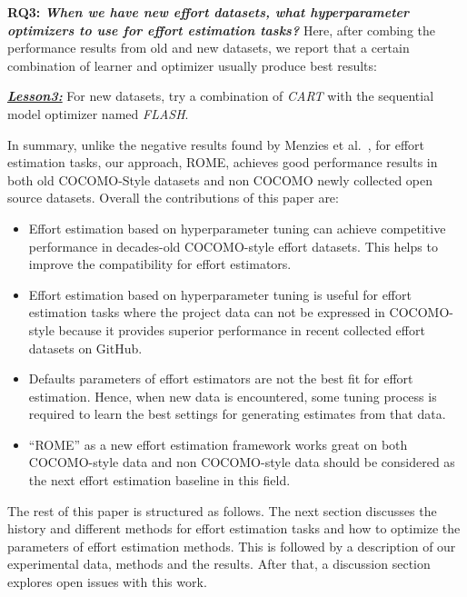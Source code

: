 \documentclass[sigconf,review,anonymous]{acmart}
\newcommand{\bi}{\begin{itemize}}
\newcommand{\ei}{\end{itemize}}
\newenvironment{result}[2]
{\begin{myshadowbox}\textbf{\textit{\underline{Lesson#1:}}} #2}{ 
\end{myshadowbox}}
\begin{document}
{\bf RQ3: \em When we have new effort datasets, what hyperparameter optimizers to use for effort estimation tasks?} Here, after combing the performance results from old and new datasets, we report that a certain combination  of learner and optimizer usually
produce best results:
\begin{result}{3}
For new datasets, try a combination of {\em CART} with the sequential model optimizer named {\em FLASH}.
\end{result}


In summary, unlike the negative results found by Menzies et al.~\cite{MenziesNeg:2017}, for effort estimation tasks, our approach, ROME, achieves good performance results in both old COCOMO-Style datasets and non COCOMO newly collected open source datasets. Overall the contributions of this paper are:
\bi
\item Effort estimation based on hyperparameter tuning can achieve competitive performance in  decades-old COCOMO-style effort datasets. This helps to improve the compatibility for effort estimators. 

\item  Effort estimation based on hyperparameter tuning is useful for  effort estimation tasks where the project data can not be expressed in COCOMO-style because it provides superior performance in recent collected effort datasets on GitHub.

\item Defaults parameters of effort estimators are not the best fit for effort estimation. Hence, when new
data is encountered, some tuning process is required
to learn the best settings for generating estimates
from that data.

\item ``ROME'' as a new effort estimation framework works great on both COCOMO-style data and non COCOMO-style data should be considered as the next effort estimation baseline in this field.
\ei
The rest of this paper is structured as follows.
The next section discusses the history and different methods for effort estimation tasks and how to optimize
the parameters of effort estimation methods. This is followed by a description of our experimental data, methods and the results. After that, a discussion section explores open issues with this work. 
\end{document}
